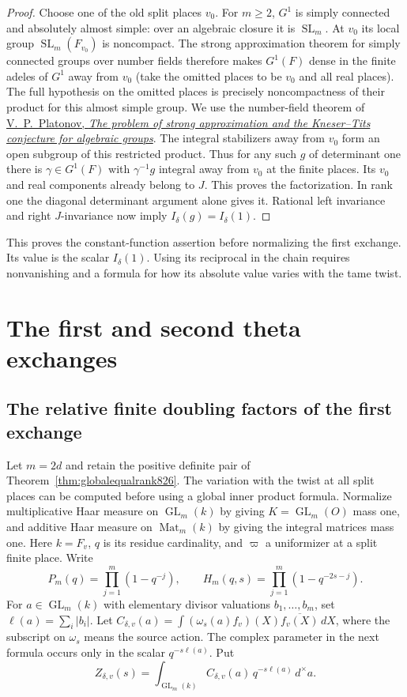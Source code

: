 \documentclass[a4paper,11pt]{article}
\theoremstyle{definition}
\theoremstyle{remark}
\numberwithin{equation}{section}
\begin{document}
\begin{proof}
Choose one of the old split places \(v_0\). For \(m\ge2\),
\(G^1\) is simply connected and absolutely almost simple:
over an algebraic closure it is \(\operatorname{SL}_m\).
At \(v_0\) its local group \(\operatorname{SL}_m(F_{v_0})\)
is noncompact. The strong approximation theorem for simply
connected groups over number fields therefore makes \(G^1(F)\)
dense in the finite adeles of \(G^1\) away from \(v_0\)
(take the omitted places to be \(v_0\) and all real places).
The full hypothesis on the omitted places is precisely
noncompactness of their product for this almost simple group.
We use the number-field theorem of
\href{https://www.mathnet.ru/eng/im2220}{V.~P.~Platonov,
\emph{The problem of strong approximation and the Kneser--Tits
conjecture for algebraic groups}}.
The integral stabilizers away from \(v_0\) form an open
subgroup of this restricted product. Thus for any such \(g\)
of determinant one there is \(\gamma\in G^1(F)\) with
\(\gamma^{-1}g\) integral away from \(v_0\) at the finite
places. Its \(v_0\) and real components already belong to
\(J\). This proves the factorization. In rank one the diagonal
determinant argument alone gives it. Rational left invariance
and right \(J\)-invariance now imply \(I_\delta(g)=I_\delta(1)\).
\end{proof}

This proves the constant-function assertion before normalizing
the first exchange. Its value is the scalar
\(I_\delta(1)\). Using its reciprocal in the chain requires
nonvanishing and a formula for how its absolute value varies
with the tame twist.
\clearpage

\section{The first and second theta exchanges}\label{nav:first-second-exchange}

\subsection{The relative finite doubling factors of the first exchange}
\label{sec:squarefactors827}
Let \(m=2d\) and retain the positive definite pair of
Theorem~\ref{thm:globalequalrank826}. The variation with the
twist at all split places can be computed before using a
global inner product formula. Normalize multiplicative Haar
measure on \(\operatorname{GL}_m(k)\) by giving
\(K=\operatorname{GL}_m(O)\) mass one, and additive Haar measure
on \(\operatorname{Mat}_m(k)\) by giving the integral matrices
mass one. Here \(k=F_v\), \(q\) is its residue cardinality,
and \(\varpi\) a uniformizer at a split finite place. Write
\[
  P_m(q)=\prod_{j=1}^m(1-q^{-j}),\qquad
  H_m(q,s)=\prod_{j=1}^m(1-q^{-2s-j}).
\]
For \(a\in\operatorname{GL}_m(k)\) with elementary divisor
valuations \(b_1,\ldots,b_m\), set \(\ell(a)=\sum_i|b_i|\).
Let \(C_{\delta,v}(a)=\int(\omega_s(a)f_v)(X)\overline{f_v(X)}\,dX\),
where the subscript on \(\omega_s\) means the source action.
The complex parameter in the next formula occurs only in the
scalar \(q^{-s\ell(a)}\). Put
\[
      Z_{\delta,v}(s)=\int_{\operatorname{GL}_m(k)}
                  C_{\delta,v}(a)\,q^{-s\ell(a)}\,d^\times a .
\]
\end{document}
